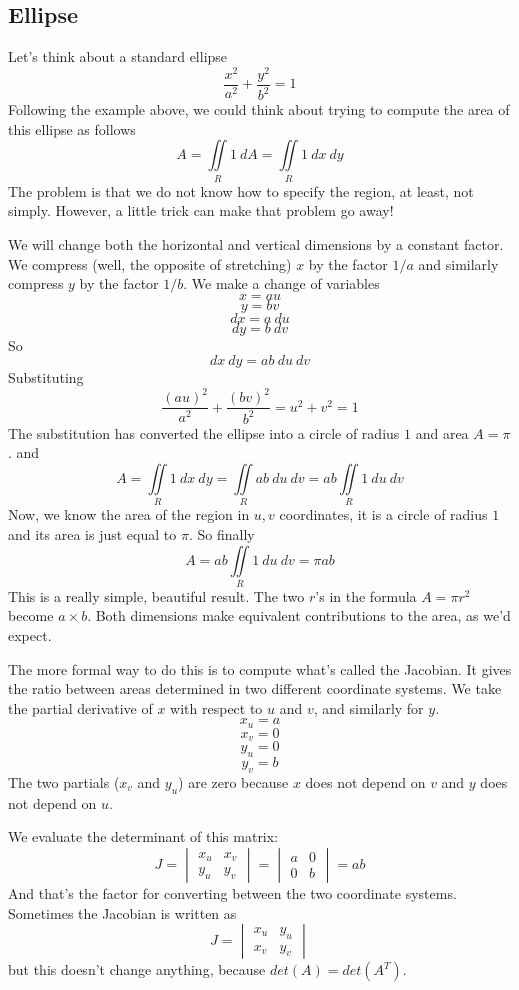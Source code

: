 \documentclass[11pt, oneside]{report}   	%
\begin{document}
\subsection*{Ellipse}

Let's think about a standard ellipse
\[ \frac{x^2}{a^2} + \frac{y^2}{b^2} = 1 \]
Following the example above, we could think about trying to compute the area of this ellipse as follows
\[ A = \iint\limits_{R} 1 \ dA = \iint\limits_{R} 1 \ dx \ dy \]
The problem is that we do not know how to specify the region, at least, not simply.  However, a little trick can make that problem go away!
\vspace{5 mm}

\noindent
We will change both the horizontal and vertical dimensions by a constant factor.  We compress (well, the opposite of stretching) $x$ by the factor $1/a$ and similarly compress $y$ by the factor $1/b$.  We make a change of variables
\[ x = au\] 
\[ y = bv \]
\[ dx = a\ du \]
\[ dy = b\ dv \]
So 
\[ dx \ dy = ab \ du \ dv \]
Substituting
\[ \frac{(au)^2}{a^2} + \frac{(bv)^2}{b^2} = u^2 + v^2 = 1\]
The substitution has converted the ellipse into a circle of radius $1$ and area $A = \pi$.
and
\[ A = \iint\limits_{R} 1 \ dx \ dy =  \iint\limits_{R} ab \ du \ dv = ab \iint\limits_{R} 1 \ du \ dv \]
Now, we know the area of the region in $u,v$ coordinates, it is a circle of radius $1$ and its area is just equal to $\pi$.  So finally
\[ A = ab \iint\limits_{R} 1 \ du \ dv = \pi a b \]
This is a really simple, beautiful result.  The two $r$'s in the formula $A= \pi r^2$ become $a \times b$.  Both dimensions make equivalent contributions to the area, as we'd expect.
\vspace{5 mm}

\noindent
The more formal way to do this is to compute what's called the Jacobian.  It gives the ratio between areas determined in two different coordinate systems.  We take the partial derivative of $x$ with respect to $u$ and $v$, and similarly for $y$.
\[ x_u = a \]
\[ x_v = 0 \]
\[ y_u = 0 \]
\[ y_v = b \]
The two partials ($x_v$ and $y_u$) are zero because $x$ does not depend on $v$ and  $y$ does not depend on $u$.

We evaluate the determinant of this matrix:
\[ J = 
\begin{vmatrix}
x_u & x_v \\
y_u & y_v 
\end{vmatrix} =
\begin{vmatrix}
a & 0 \\
0 & b
\end{vmatrix} =ab
\]
And that's the factor for converting between the two coordinate systems.
Sometimes the Jacobian is written as
\[ J = 
\begin{vmatrix}
x_u & y_u \\
x_v & y_v 
\end{vmatrix}
\]
but this doesn't change anything, because $det(A) = det(A^T)$.
\end{document}
